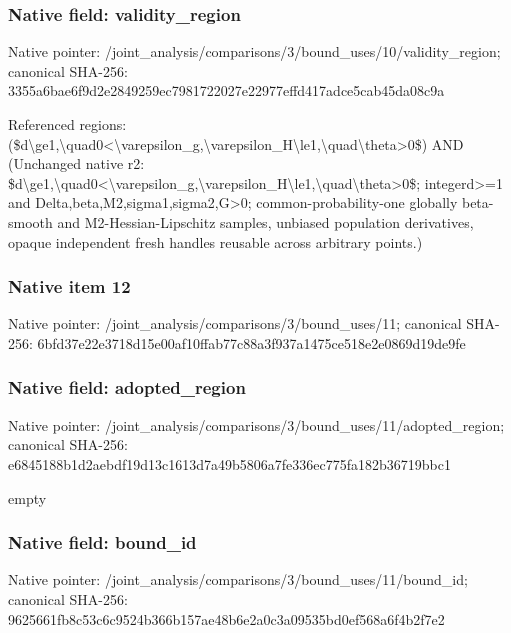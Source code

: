 \documentclass[10pt,a4paper]{article}
\begin{document}
\subsubsection{Native field: validity\_\allowbreak{}region}
Native pointer: /joint\_\allowbreak{}analysis/comparisons/3/bound\_\allowbreak{}uses/10/validity\_\allowbreak{}region; canonical SHA-256: 3355a6bae6f9d2e2849259ec7981722027e22977effd417adce5cab45da08c9a

\begingroup\raggedright\sloppy Referenced regions:\allowbreak{} (\$d\textbackslash{}ge1,\allowbreak{}\textbackslash{}quad0<\textbackslash{}varepsilon\_\allowbreak{}g,\allowbreak{}\textbackslash{}varepsilon\_\allowbreak{}H\textbackslash{}le1,\allowbreak{}\textbackslash{}quad\textbackslash{}theta>0\$) AND (Unchanged native r2:\allowbreak{} \$d\textbackslash{}ge1,\allowbreak{}\textbackslash{}quad0<\textbackslash{}varepsilon\_\allowbreak{}g,\allowbreak{}\textbackslash{}varepsilon\_\allowbreak{}H\textbackslash{}le1,\allowbreak{}\textbackslash{}quad\textbackslash{}theta>0\$;\allowbreak{} integerd>=\allowbreak{}1 and Delta,\allowbreak{}beta,\allowbreak{}M2,\allowbreak{}sigma1,\allowbreak{}sigma2,\allowbreak{}G>0;\allowbreak{} common-probability-one globally beta-smooth and M2-Hessian-Lipschitz samples,\allowbreak{} unbiased population derivatives,\allowbreak{} opaque independent fresh handles reusable across arbitrary points.)\par\endgroup

\subsubsection{Native item 12}
Native pointer: /joint\_\allowbreak{}analysis/comparisons/3/bound\_\allowbreak{}uses/11; canonical SHA-256: 6bfd37e22e3718d15e00af10ffab77c88a3f937a1475ce518e2e0869d19de9fe

\subsubsection{Native field: adopted\_\allowbreak{}region}
Native pointer: /joint\_\allowbreak{}analysis/comparisons/3/bound\_\allowbreak{}uses/11/adopted\_\allowbreak{}region; canonical SHA-256: e6845188b1d2aebdf19d13c1613d7a49b5806a7fe336ec775fa182b36719bbc1

\begingroup\raggedright\sloppy empty\par\endgroup

\subsubsection{Native field: bound\_\allowbreak{}id}
Native pointer: /joint\_\allowbreak{}analysis/comparisons/3/bound\_\allowbreak{}uses/11/bound\_\allowbreak{}id; canonical SHA-256: 9625661fb8c53c6c9524b366b157ae48b6e2a0c3a09535bd0ef568a6f4b2f7e2
\end{document}
